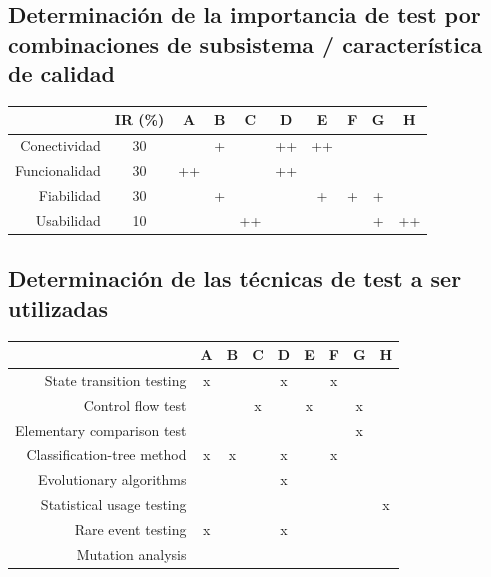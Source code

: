 \documentclass[
    11pt,
    spanish,
	a4paper
]{article}
\begin{document}
\subsection{Determinación de la importancia de test por combinaciones de subsistema / característica de calidad}
\label{sub:combinacion}

\begin{table}[H]
\centering
\begin{tabular}{r|ccccccccc}
    & IR (\%) & A & B & C & D & E & F & G & H \\ \hline
    Conectividad  & 30 &    & +  &    & ++ & ++ &    &    &    \\
    Funcionalidad & 30 & ++ &    &    & ++ &    &    &    &    \\
    Fiabilidad    & 30 &    & +  &    &    & +  & +  & +  &    \\
    Usabilidad    & 10 &    &    & ++ &    &    &    & +  & ++ \\
\end{tabular}
\end{table}


\subsection{Determinación de las técnicas de test a ser utilizadas}
\label{sub:tecnicas}

\begin{table}[H]
\centering
\begin{tabular}{r|cccccccc}
    & A & B & C & D & E & F & G & H\\ \hline
    State transition testing   & x &   &   & x &   & x &   &   \\
    Control flow test          &   &   & x &   & x &   & x &   \\
    Elementary comparison test &   &   &   &   &   &   & x &   \\
    Classification-tree method & x & x &   & x &   & x &   &   \\
    Evolutionary algorithms    &   &   &   & x &   &   &   &   \\
    Statistical usage testing  &   &   &   &   &   &   &   & x \\
    Rare event testing         & x &   &   & x &   &   &   &   \\
    Mutation analysis          &   &   &   &   &   &   &   &   \\

\end{tabular}
\end{table}
\end{document}
